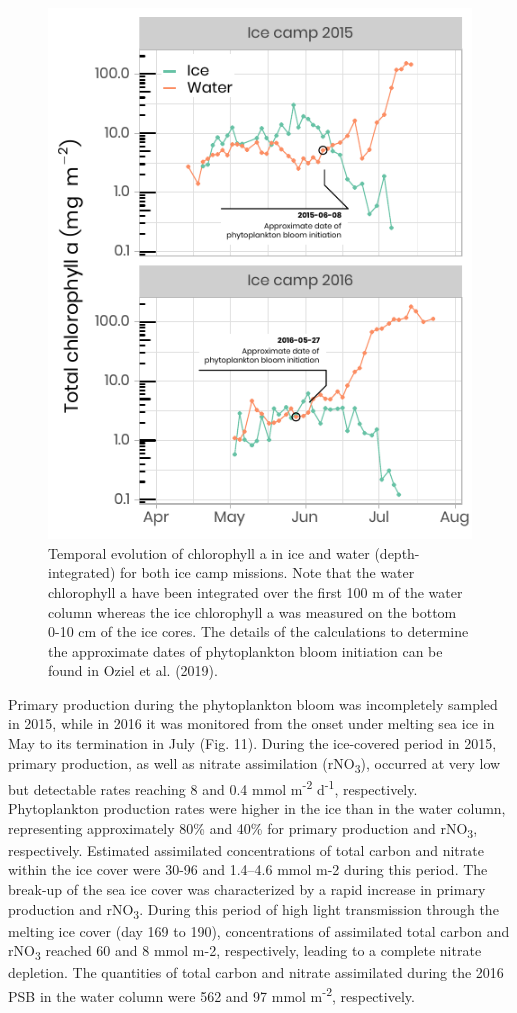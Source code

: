 \documentclass[essd, manuscript]{copernicus}
\begin{document}
\begin{figure}[H]
	\centering
	\includegraphics[scale = 1]{../../../graphs/fig10.pdf}
	\caption{Temporal evolution of chlorophyll a in ice and water (depth-integrated) for both ice camp missions. Note that the water chlorophyll a have been integrated over the first 100 m of the water column whereas the ice chlorophyll a was measured on the bottom 0-10 cm of the ice cores. The details of the calculations to determine the approximate dates of phytoplankton bloom initiation can be found in Oziel et al. (2019).}
\end{figure}

Primary production during the phytoplankton bloom was incompletely sampled in 2015, while in 2016 it was monitored from the onset under melting sea ice in May to its termination in July (Fig. 11). During the ice-covered period in 2015, primary production, as well as nitrate assimilation (rNO\textsubscript{3}), occurred at very low but detectable rates reaching 8 and 0.4 mmol m\textsuperscript{-2} d\textsuperscript{-1}, respectively. Phytoplankton production rates were higher in the ice than in the water column, representing approximately 80\% and 40\% for primary production and rNO\textsubscript{3}, respectively. Estimated assimilated concentrations of total carbon and nitrate within the ice cover were 30-96 and 1.4–4.6 mmol m-2 during this period.  The break-up of the sea ice cover was characterized by a rapid increase in primary production and rNO\textsubscript{3}. During this period of high light transmission through the melting ice cover (day 169 to 190), concentrations of assimilated total carbon and rNO\textsubscript{3} reached 60 and 8 mmol m-2, respectively, leading to a complete nitrate depletion. The quantities of total carbon and nitrate assimilated during the 2016 PSB in the water column were 562 and 97 mmol m\textsuperscript{-2}, respectively.
\end{document}
